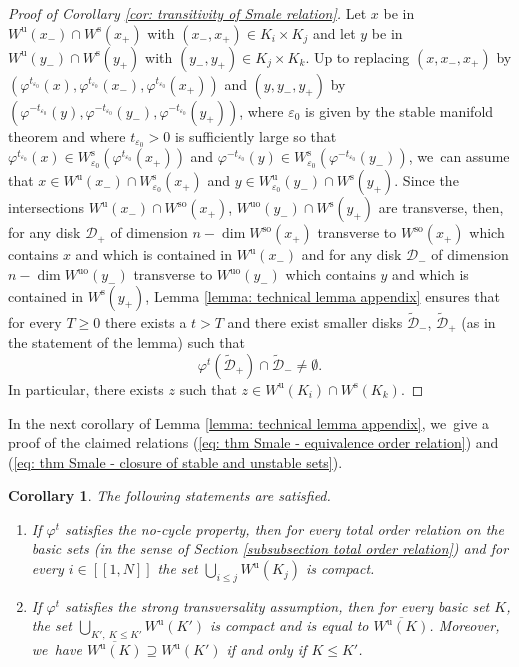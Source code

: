 \documentclass[11pt]{article}
\newcommand{\lcr}{[\![}
\newcommand{\rcr}{]\!]}
\newcommand{\rs}{\mathrm{s}}
\newcommand{\rso}{\mathrm{so}}
\newcommand{\ru}{\mathrm{u}}
\newcommand{\ruo}{\mathrm{uo}}
\theoremstyle{definition}
\theoremstyle{plain}
\newtheorem{corollary}[definition]{Corollary}
\newcommand{\D}{\mathcal{D}}
\begin{document}
\begin{appendix}
\begin{proof}[Proof of Corollary \ref{cor: transitivity of Smale relation}]
Let $x$ be in $W^\ru (x_-) \cap W^\rs (x_+)$ with $(x_-,x_+) \in K_i \times K_j$ and let $y$ be in $W^\ru (y_-) \cap W^\rs (y_+)$ with $(y_-,y_+) \in K_j \times K_k$. Up to replacing $(x,x_-,x_+)$ by $(\varphi^{t_{\varepsilon_0}}(x), \varphi^{t_{\varepsilon_0}} (x_-), \varphi^{t_{\varepsilon_0}}(x_+))$ and $(y,y_-,y_+)$ by $(\varphi^{-t_{\varepsilon_0}}(y), \varphi^{-t_{\varepsilon_0}} (y_-), \varphi^{-t_{\varepsilon_0}}(y_+))$, where $\varepsilon_0$ is given by the stable manifold theorem and where $t_{\varepsilon_0} > 0$ is sufficiently large so that $\varphi^{t_{\varepsilon_0}}(x) \in W_{\varepsilon_0}^\rs (\varphi^{t_{\varepsilon_0}}(x_+))$ and $\varphi^{-t_{\varepsilon_0}}(y) \in W_{\varepsilon_0}^\rs (\varphi^{-t_{\varepsilon_0}}(y_-))$, we~can assume that $x \in W^\ru (x_-) \cap W_{\varepsilon_0}^\rs (x_+)$ and $y \in W_{\varepsilon_0}^\ru (y_-) \cap W^\rs (y_+)$. Since the intersections $W^{\ru} (x_-) \cap W^{\rso} (x_+)$, $W^{\ruo} (y_-) \cap W^{\rs} (y_+)$ are transverse, then, for any disk $\D_{+}$ of dimension $n - \dim W^{\rso} (x_+)$ transverse to $W^{\rso} (x_+)$ which contains $x$ and which is contained in $W^{\ru} (x_-)$ and for any disk $\D_{-}$ of dimension $n - \dim W^{\ruo} (y_-)$ transverse to $W^{\ruo} (y_-)$ which contains $y$ and which is contained in $W^{\rs} (y_+)$, Lemma \ref{lemma: technical lemma appendix} ensures that for every $T \geq 0$ there exists a $t > T$ and there exist smaller disks $\widetilde{\D}_-$, $\widetilde{\D}_+$ (as in the statement of the lemma) such that
\[
\varphi^t (\widetilde{\D}_{+}) \cap \widetilde{\D}_{-} \neq \emptyset.
\]
In particular, there exists $z$ such that $z \in W^{\ru} (K_i) \cap W^{\rs}(K_k)$.
\end{proof}

In the next corollary of Lemma \ref{lemma: technical lemma appendix}, we~give a proof of the claimed relations (\ref{eq: thm Smale - equivalence order relation}) and (\ref{eq: thm Smale - closure of stable and unstable sets}).

\begin{corollary}\label{cor: corollary technical lemma - closure of unstable sets} The following statements are satisfied.
\begin{enumerate}
\item\label{cor: corollary technical lemma - closure of unstable sets1} If $\varphi^t$ satisfies the no-cycle property, then for every total order relation on the basic sets (in the sense of Section \ref{subsubsection total order relation}) and for every $i\in\lcr1,N\rcr$ the set $\bigcup_{i \leq j}\!W^\ru (K_j)$ is compact.
\item\label{cor: corollary technical lemma - closure of unstable sets2} If $\varphi^t$ satisfies the strong transversality assumption, then for every basic set $K$, the set $\bigcup_{K', \: K \leq K'} W^\ru (K')$ is compact and is equal to $\overline{W^\ru (K)}$. Moreover, we~have $\overline{W^\ru (K)} \supseteq W^\ru (K')$ if and only if $K \leq K'$.
\end{enumerate}
\end{corollary}


\end{appendix}
\end{document}
